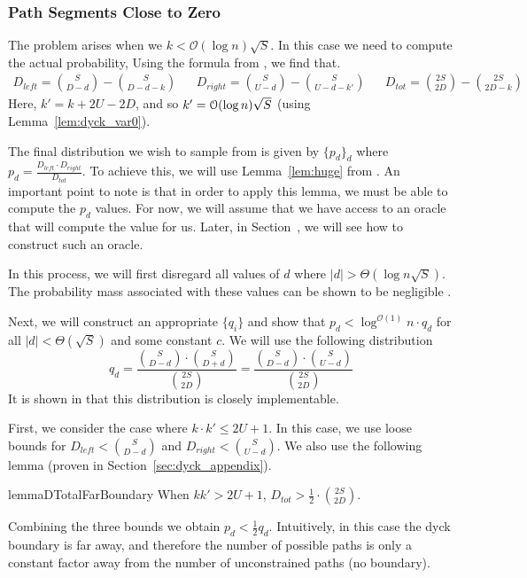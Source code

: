 \subsubsection{Path Segments Close to Zero}
The problem arises when we $k <\mathcal{O}(\log n)\sqrt{S}$. In this case we need to compute the actual probability,
Using the formula from \cite{trap}, we find that.
{\scriptsize
    \begin{align}
        D_{left} = {{S}\choose{D-d}}-{{S}\choose{D-d-k}}
        &&D_{right} = {{S}\choose{U-d}}-{{S}\choose{U-d-k'}}
        &&D_{tot} = {{2S}\choose{2D}}-{{2S}\choose{2D-k}}
    \end{align}
}
Here, $k' = k+2U-2D$, and so $k' = \Bo(\log n)\sqrt S$ (using Lemma~\ref{lem:dyck_var0}).

The final distribution we wish to sample from is given by $\{p_d\}_d$ where $p_d = \frac{D_{left}\cdot D_{right}}{D_{tot}}$.
To achieve this, we will use Lemma~\ref{lem:huge} from \cite{huge}.
An important point to note is that in order to apply this lemma, we must be able to compute the $p_d$ values.
For now, we will assume that we have access to an oracle that will compute the value for us.
Later, in Section~, we will see how to construct such an oracle.

In this process, we will first disregard all values of $d$ where $|d|>\Theta(\log n\sqrt S)$.
The probability mass associated with these values can be shown to be negligible .

Next, we will construct an appropriate $\{q_i\}$ and show that $p_d < \log^{\mathcal{O}(1)} n\cdot q_d$
for all $|d|<\Theta(\sqrt S)$ and some constant $c$.
We will use the following distribution
$$
q_d = \frac{{S\choose D-d}\cdot{S\choose D+d}}{{2S\choose 2D}} = \frac{{S\choose D-d}\cdot{S\choose U-d}}{{2S\choose 2D}}
$$
It is shown in \cite{huge} that this distribution is closely implementable.

First, we consider the case where $k\cdot k'\le 2U+1$.
In this case, we use loose bounds for $D_{left} < \binom{S}{D-d}$ and $D_{right} < \binom{S}{U-d}$.
We also use the following lemma (proven in Section~\ref{sec:dyck_appendix}).

\begin{restatable}{lemma}{DTotalFarBoundary}
\label{lem:DTotalFarBoundary}
When $kk' > 2U + 1$, $D_{tot} > \frac 12\cdot \binom{2S}{2D}$.
\end{restatable}

Combining the three bounds we obtain $p_d < \frac 12 q_d$.
Intuitively, in this case the dyck boundary is far away, and therefore the number of possible paths
is only a constant factor away from the number of unconstrained paths (no boundary).

